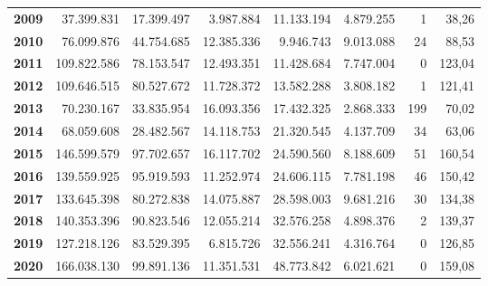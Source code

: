 \begin{table}[h!]
\begin{adjustbox}{width=1.5\textwidth, center}
\begin{tabular}{|l|r|r|r|r|r|r|r|}
        \textbf{2009}       & 37.399.831            & 17.399.497            & 3.987.884                 & 11.133.194            & 4.879.255                 & 1             & 38,26         \\
        \textbf{2010}       & 76.099.876            & 44.754.685            & 12.385.336                & 9.946.743             & 9.013.088                 & 24            & 88,53         \\
        \textbf{2011}       & 109.822.586           & 78.153.547            & 12.493.351                & 11.428.684            & 7.747.004                 & 0             & 123,04        \\
        \midrule
        \textbf{2012}       & 109.646.515           & 80.527.672            & 11.728.372                & 13.582.288            & 3.808.182                 & 1             & 121,41        \\
        \textbf{2013}       & 70.230.167            & 33.835.954            & 16.093.356                & 17.432.325            & 2.868.333                 & 199           & 70,02         \\
        \textbf{2014}       & 68.059.608            & 28.482.567            & 14.118.753                & 21.320.545            & 4.137.709                 & 34            & 63,06         \\
        \textbf{2015}       & 146.599.579           & 97.702.657            & 16.117.702                & 24.590.560            & 8.188.609                 & 51            & 160,54        \\
        \textbf{2016}       & 139.559.925           & 95.919.593            & 11.252.974                & 24.606.115            & 7.781.198                 & 46            & 150,42        \\
        \textbf{2017}       & 133.645.398           & 80.272.838            & 14.075.887                & 28.598.003            & 9.681.216                 & 30            & 134,38        \\
        \midrule
        \textbf{2018}       & 140.353.396           & 90.823.546            & 12.055.214                & 32.576.258            & 4.898.376                 & 2             & 139,37        \\
        \textbf{2019}       & 127.218.126           & 83.529.395            & 6.815.726                 & 32.556.241            & 4.316.764                 & 0             & 126,85        \\
        \textbf{2020}       & 166.038.130           & 99.891.136            & 11.351.531                & 48.773.842            & 6.021.621                 & 0             & 159,08        \\

\end{tabular}
\end{adjustbox}
\end{table}
